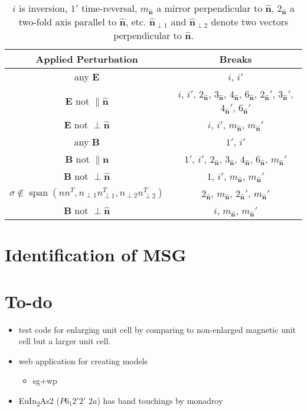 \documentclass[12pt, a4paper]{article}
\DeclareMathOperator{\spn}{span}
\begin{document}
\newcommand{\ndtwonio}{Nd\textsubscript{2}NiO\textsubscript{4.11}}



\newcommand{\nhat}{\hat{\bm{n}}}
\begin{table}[htpb]
  \centering
\begin{tabular}{cc}
  \toprule
  Applied Perturbation & Breaks\\
  \midrule
  any $\bm{E}$ & $i$, $i'$\\
  $\bm{E}$ not $\parallel \nhat$ & $i$, $i'$, $2_{\nhat}$, $3_{\nhat}$, $4_{\nhat}$, $6_{\nhat}$, $2_{\nhat}'$, $3_{\nhat}'$, $4_{\nhat}'$, $6_{\nhat}'$\\
  $\bm{E}$ not $\perp \nhat$ & $i$, $i'$, $m_{\nhat}$, $m_{\nhat}'$\\
  any $\bm{B}$ & $1'$, $i'$\\
  $\bm{B}$ not $\parallel \nhat$ & $1'$, $i'$, $2_{\nhat}$, $3_{\nhat}$, $4_{\nhat}$, $6_{\nhat}$, $m_{\nhat}'$\\
  $\bm{B}$ not $\perp \nhat$ & $1$, $i'$, $m_{\nhat}$, $m_{\nhat}'$\\
  $\sigma\notin\spn (nn^T,n_{\perp1}n_{\perp1}^T,n_{\perp2}n_{\perp2}^T)$ & $2_{\nhat}$, $m_{\nhat}$, $2_{\nhat}'$, $m_{\nhat}'$\\
  $\bm{B}$ not $\perp \nhat$ & $i$, $m_{\nhat}$, $m_{\nhat}'$\\
  \bottomrule
\end{tabular}
  \caption{$i$ is inversion, $1'$ time-reversal, $m_{\nhat}$ a mirror perpendicular to $\nhat$, $2_{\nhat}$ a two-fold axis parallel to $\nhat$, etc. $\nhat_{\perp1}$ and $\nhat_{\perp2}$ denote two vectors perpendicular to $\nhat$.}
\end{table}

\section*{Identification of MSG}
\section*{To-do}
\begin{itemize}
  \item test code for enlarging unit cell by comparing to non-enlarged magnetic unit cell but a larger unit cell.
  \item web application for creating models
    \begin{itemize}
      \item sg+wp
    \end{itemize}
  \item EuIn\textsubscript{2}As2 ($P6_{1}2'2'$ $2a$) has band touchings by monadroy
\end{itemize}

{}

\end{document}
